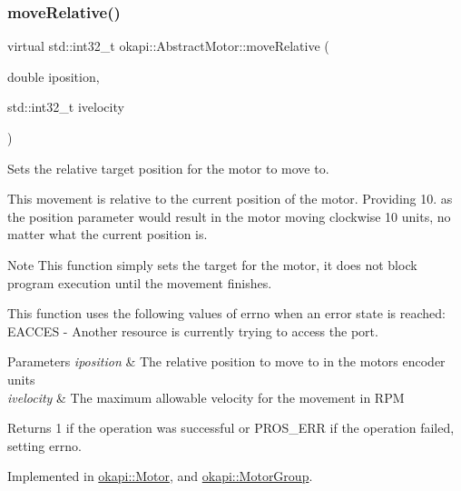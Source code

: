 \mbox{\label{classokapi_1_1AbstractMotor_a5a65d70a30f536593326cb754700e240}} 
\subsubsection{\texorpdfstring{moveRelative()}{moveRelative()}}
{\footnotesize\ttfamily virtual std\+::int32\+\_\+t okapi\+::\+Abstract\+Motor\+::move\+Relative (\begin{DoxyParamCaption}\item[{double}]{iposition,  }\item[{std\+::int32\+\_\+t}]{ivelocity }\end{DoxyParamCaption})\hspace{0.3cm}{\ttfamily [pure virtual]}}

Sets the relative target position for the motor to move to.

This movement is relative to the current position of the motor. Providing 10. as the position parameter would result in the motor moving clockwise 10 units, no matter what the current position is.

\begin{DoxyNote}{Note}
This function simply sets the target for the motor, it does not block program execution until the movement finishes.
\end{DoxyNote}
This function uses the following values of errno when an error state is reached\+: E\+A\+C\+C\+ES -\/ Another resource is currently trying to access the port.


\begin{DoxyParams}{Parameters}
{\em iposition} & The relative position to move to in the motor\textquotesingle{}s encoder units \\
\hline
{\em ivelocity} & The maximum allowable velocity for the movement in R\+PM \\
\hline
\end{DoxyParams}
\begin{DoxyReturn}{Returns}
1 if the operation was successful or P\+R\+O\+S\+\_\+\+E\+RR if the operation failed, setting errno. 
\end{DoxyReturn}


Implemented in \mbox{\hyperlink{classokapi_1_1Motor_a40f6f70ed9b12d1834551d1232303ef1}{okapi\+::\+Motor}}, and \mbox{\hyperlink{classokapi_1_1MotorGroup_a4295103133b5cb721dfb457a8cc8c2bc}{okapi\+::\+Motor\+Group}}.

